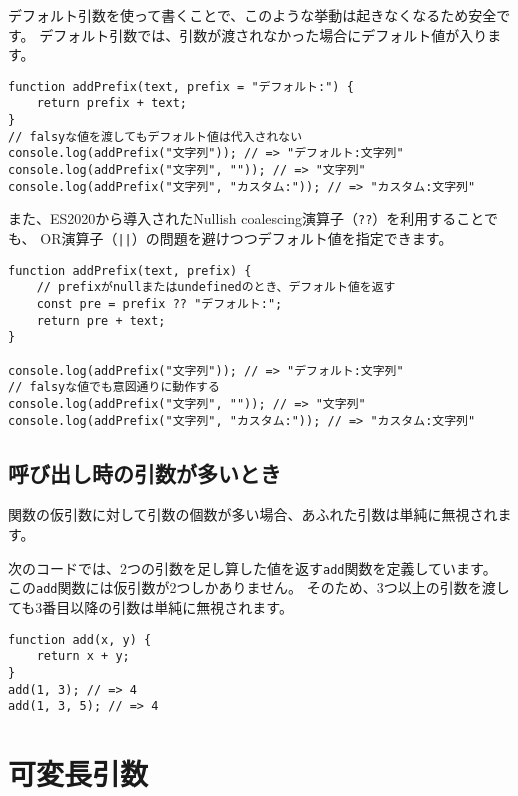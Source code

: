 デフォルト引数を使って書くことで、このような挙動は起きなくなるため安全です。
デフォルト引数では、引数が渡されなかった場合にデフォルト値が入ります。

\enlargethispage{\baselineskip}\begin{lstlisting}
function addPrefix(text, prefix = "デフォルト:") {
    return prefix + text;
}
// falsyな値を渡してもデフォルト値は代入されない
console.log(addPrefix("文字列")); // => "デフォルト:文字列"
console.log(addPrefix("文字列", "")); // => "文字列"
console.log(addPrefix("文字列", "カスタム:")); // => "カスタム:文字列"
\end{lstlisting}

また、ES2020から導入されたNullish coalescing演算子（\texttt{??}）を利用することでも、
OR演算子（\lstinline{||}）の問題を避けつつデフォルト値を指定できます。

\begin{lstlisting}
function addPrefix(text, prefix) {
    // prefixがnullまたはundefinedのとき、デフォルト値を返す
    const pre = prefix ?? "デフォルト:";
    return pre + text;
}

console.log(addPrefix("文字列")); // => "デフォルト:文字列"
// falsyな値でも意図通りに動作する
console.log(addPrefix("文字列", "")); // => "文字列"
console.log(addPrefix("文字列", "カスタム:")); // => "カスタム:文字列"
\end{lstlisting}

\hypertarget{function-more-arguments}{%
\subsection{呼び出し時の引数が多いとき}\label{function-more-arguments}}

関数の仮引数に対して引数の個数が多い場合、あふれた引数は単純に無視されます。

次のコードでは、2つの引数を足し算した値を返す\texttt{add}関数を定義しています。
この\texttt{add}関数には仮引数が2つしかありません。
そのため、3つ以上の引数を渡しても3番目以降の引数は単純に無視されます。

\begin{lstlisting}
function add(x, y) {
    return x + y;
}
add(1, 3); // => 4
add(1, 3, 5); // => 4
\end{lstlisting}

\hypertarget{variable-arguments}{%
\section{可変長引数}\label{variable-arguments}}

